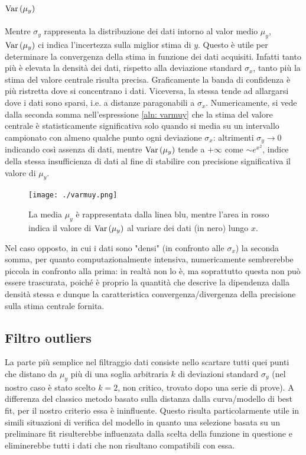 \documentclass{article}[a4paper, oneside, 11pt]
\begin{document}
\subsection{$\text{Var}\left(\mu_y\right)$}
Mentre $\sigma_y$ rappresenta la distribuzione dei dati intorno al valor medio 
$\mu_y$, $\text{Var}\left(\mu_y\right)$ ci indica l’incertezza sulla miglior stima di $y$.
Questo \`e utile per determinare la convergenza della stima in funzione dei
dati acquisiti. Infatti tanto pi\`u \`e elevata la densit\`a dei dati,
rispetto alla deviazione standard $\sigma_x$, tanto pi\`u la stima del valore
centrale risulta precisa.
Graficamente la banda di confidenza \`e pi\`u ristretta dove si concentrano
i dati.
Viceversa, la stessa tende ad allargarsi dove i dati sono sparsi, i.e. a
distanze paragonabili a $\sigma_x$. Numericamente, si vede dalla seconda somma
nell'espressione \eqref{aln: varmuy} che la stima del valore centrale \`e
statisticamente significativa solo quando si media su un intervallo campionato
con almeno qualche punto ogni deviazione $\sigma_x$: altrimenti $\sigma_y \to 0$
indicando cos\`i assenza di dati, mentre $\text{Var}\left(\mu_y\right)$ tende a $+\infty$ come
$\sim e^{x^2}$, indice della stessa insufficienza di dati al fine di stabilire
con precisione significativa il valore di $\mu_y$.
\begin{figure}[!htb]
	\centering 
 		\texttt{[image: ./varmuy.png]}
 	\caption{La media $\mu_y$ \`e rappresentata dalla linea blu, mentre
	l'area in rosso indica il valore di $\text{Var}\left(\mu_y\right)$ al variare dei
	dati (in nero) lungo $x$. \label{fig: varmuy}}
\end{figure}
Nel caso opposto, in cui i dati sono "densi" (in confronto alle $\sigma_x$)
la seconda somma, per quanto computazionalmente intensiva, numericamente
sembrerebbe piccola in confronto alla prima: in realt\`a non lo \`e, ma
soprattutto questa non pu\`o essere trascurata, poich\'e \`e proprio la
quantit\`a che descrive la dipendenza dalla densit\`a stessa e dunque la
caratteristica convergenza/divergenza della precisione sulla stima centrale
fornita.

\subsection{Filtro outliers}
La parte pi\`u semplice nel filtraggio dati consiste nello scartare tutti quei
punti che distano da $\mu_y$ pi\`u di una soglia arbitraria $k$ di deviazioni
standard $\sigma_y$ (nel nostro caso \`e stato scelto $k = 2$, non critico,
trovato dopo una serie di prove). A differenza del classico metodo basato
sulla distanza dalla curva/modello di best fit, per il nostro criterio essa
\`e ininfluente. Questo risulta particolarmente utile in simili situazioni di
verifica del modello in quanto una selezione basata su un preliminare fit
risulterebbe influenzata dalla scelta della funzione in questione e
eliminerebbe tutti i dati che non risultano compatibili con essa.
\end{document}
